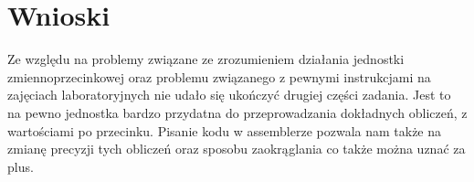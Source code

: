 \section{Wnioski}
Ze względu na problemy związane ze zrozumieniem działania jednostki zmiennoprzecinkowej oraz problemu związanego z pewnymi instrukcjami na zajęciach laboratoryjnych nie udało się ukończyć drugiej części zadania. Jest to na pewno jednostka bardzo przydatna do przeprowadzania dokładnych obliczeń, z wartościami po przecinku. Pisanie kodu w assemblerze pozwala nam także na zmianę precyzji tych obliczeń oraz sposobu zaokrąglania co także można uznać za plus.
